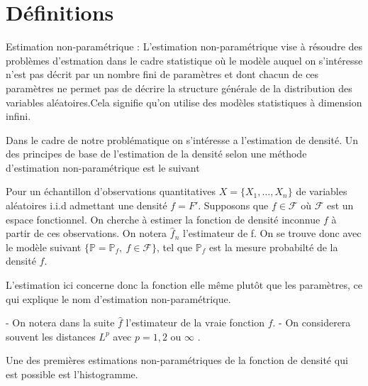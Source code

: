 \documentclass[
]{book}
\begin{document}
\hypertarget{duxe9finitions}{%
\section{Définitions}\label{duxe9finitions}}

\begin{dfn}
    Estimation non-paramétrique :\newline
 L'estimation non-paramétrique vise à résoudre des problèmes d'estmation dans le cadre statistique où le modèle auquel on s'intéresse n'est pas décrit par un nombre fini de paramètres et dont chacun de ces paramètres ne permet pas de décrire la structure générale de la distribution des variables aléatoires.\newline Cela signifie qu'on utilise des modèles statistiques à dimension infini.
\end{dfn}

Dans le cadre de notre problématique on s'intéresse a l'estimation de densité.\newline
Un des principes de base de l'estimation de la densité selon une méthode d'estimation non-paramétrique est le suivant \newline

\begin{dfn}
Pour un échantillon d'observations quantitatives $X=\{X_1, \dots,X_n\}$ de variables aléatoires i.i.d admettant une densité $f= F'$. Supposons que $f \in \mathcal F$ où $\mathcal{F}$ est un espace fonctionnel. On cherche à estimer la fonction de densité inconnue $f$ à partir de ces observations.\newline
On notera $\hat f_n$ l'estimateur de f.\newline
On se trouve donc avec le modèle suivant $\{\mathbb P=\mathbb P_f,~f \in \mathcal F\}$, 
tel que $\mathbb P_f$ est la mesure probabilté de la densité $f$.
\end{dfn}

L'estimation ici concerne donc la fonction elle même plutôt que les paramètres, ce qui explique le nom d'estimation non-paramétrique.\newline

\begin{rem}  
- On notera dans la suite $\hat f$ l'estimateur de la vraie fonction $f$.  
- On considerera souvent les distances $L^p$ avec $p = 1,2$ ou $\infty$ .
\end{rem}

Une des premières estimations non-paramétriques de la fonction de densité qui est possible est l'histogramme.
\end{document}
